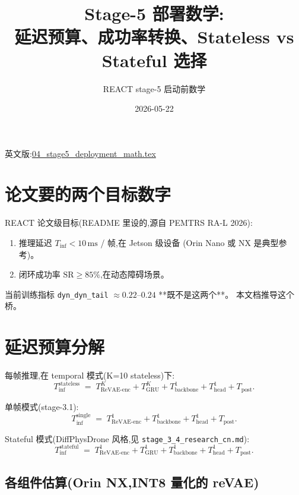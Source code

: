 \documentclass[UTF8, 11pt]{ctexart}
\title{Stage-5 部署数学:\\
       延迟预算、成功率转换、Stateless vs Stateful 选择}
\author{REACT stage-5 启动前数学}
\date{2026-05-22}
\newcommand{\ms}{\,\text{ms}}
\begin{document}
\maketitle

英文版:\href{run:./04_stage5_deployment_math.tex}{04\_stage5\_deployment\_math.tex}

\section{论文要的两个目标数字}

REACT 论文级目标(README 里设的,源自 PEMTRS RA-L 2026):
\begin{enumerate}
  \item 推理延迟 $T_{\text{inf}} < 10\ms$ / 帧,在 Jetson 级设备
        (Orin Nano 或 NX 是典型参考)。
  \item 闭环成功率 $\text{SR} \geq 85\%$,在动态障碍场景。
\end{enumerate}

当前训练指标 \texttt{dyn\_dyn\_tail} $\approx 0.22$--$0.24$ **既不是这两个**。
本文档推导这个桥。

\section{延迟预算分解}

每帧推理,在 temporal 模式(K=10 stateless)下:
\begin{equation}\label{eq:latency-stateless}
T_{\text{inf}}^{\text{stateless}}
\;=\;
T_{\text{ReVAE-enc}}^{K} + T_{\text{GRU}}^{K} + T_{\text{backbone}}^{1} +
T_{\text{head}}^{1} + T_{\text{post}}.
\end{equation}

单帧模式(stage-3.1):
\begin{equation}\label{eq:latency-single}
T_{\text{inf}}^{\text{single}}
\;=\;
T_{\text{ReVAE-enc}}^{1} + T_{\text{backbone}}^{1} +
T_{\text{head}}^{1} + T_{\text{post}}.
\end{equation}

Stateful 模式(DiffPhysDrone 风格,见
\texttt{stage\_3\_4\_research\_cn.md}):
\begin{equation}\label{eq:latency-stateful}
T_{\text{inf}}^{\text{stateful}}
\;=\;
T_{\text{ReVAE-enc}}^{1} + T_{\text{GRU}}^{1} + T_{\text{backbone}}^{1} +
T_{\text{head}}^{1} + T_{\text{post}}.
\end{equation}

\subsection{各组件估算(Orin NX,INT8 量化的 reVAE)}
\end{document}
